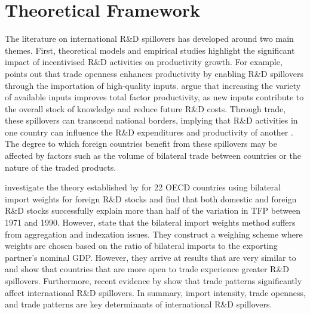 \documentclass[12pt]{article}
\begin{document}
\section{Theoretical Framework}

The literature on international R\&D spillovers has developed around two main themes. First, theoretical models and empirical studies highlight the significant impact of incentivised R\&D activities on productivity growth. For example, \citet{Grossman1991} points out that trade openness enhances productivity by enabling R\&D spillovers through the importation of high-quality inputs. \citet{Dixit1977} argue that increasing the variety of available inputs improves total factor productivity, as new inputs contribute to the overall stock of knowledge and reduce future R\&D costs. Through trade, these spillovers can transcend national borders, implying that R\&D activities in one country can influence the R\&D expenditures and productivity of another \citep{Coe2009}. The degree to which foreign countries benefit from these spillovers may be affected by factors such as the volume of bilateral trade between countries or the nature of the traded products.

\citet{Coe1995} investigate the theory established by \citet{Grossman1991} for 22 OECD countries using bilateral import weights for foreign R\&D stocks and find that both domestic and foreign R\&D stocks successfully explain more than half of the variation in TFP between 1971 and 1990. However, \citet{Lichtenberg1998} state that the bilateral import weights method suffers from aggregation and indexation issues. They construct a weighing scheme where weights are chosen based on the ratio of bilateral imports to the exporting partner's nominal GDP. However, they arrive at results that are very similar to \citet{Coe1995} and show that countries that are more open to trade experience greater R\&D spillovers. Furthermore, recent evidence by \citet{Fracasso2015} show that trade patterns significantly affect international R\&D spillovers. In summary, import intensity, trade openness, and trade patterns are key determinants of international R\&D spillovers.
\end{document}

